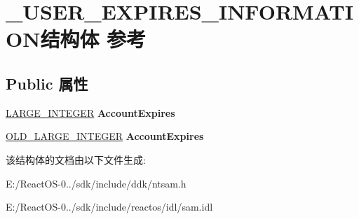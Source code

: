 \hypertarget{struct___u_s_e_r___e_x_p_i_r_e_s___i_n_f_o_r_m_a_t_i_o_n}{}\section{\+\_\+\+U\+S\+E\+R\+\_\+\+E\+X\+P\+I\+R\+E\+S\+\_\+\+I\+N\+F\+O\+R\+M\+A\+T\+I\+O\+N结构体 参考}
\label{struct___u_s_e_r___e_x_p_i_r_e_s___i_n_f_o_r_m_a_t_i_o_n}
\subsection*{Public 属性}
\begin{DoxyCompactItemize}
\item 
\mbox{\label{struct___u_s_e_r___e_x_p_i_r_e_s___i_n_f_o_r_m_a_t_i_o_n_ae59b08253328788e3d51e4ded79305cd}} 
\hyperlink{union___l_a_r_g_e___i_n_t_e_g_e_r}{L\+A\+R\+G\+E\+\_\+\+I\+N\+T\+E\+G\+ER} {\bfseries Account\+Expires}
\item 
\mbox{\label{struct___u_s_e_r___e_x_p_i_r_e_s___i_n_f_o_r_m_a_t_i_o_n_a036e6e365c93d55a422d9c0304556034}} 
\hyperlink{struct___o_l_d___l_a_r_g_e___i_n_t_e_g_e_r}{O\+L\+D\+\_\+\+L\+A\+R\+G\+E\+\_\+\+I\+N\+T\+E\+G\+ER} {\bfseries Account\+Expires}
\end{DoxyCompactItemize}


该结构体的文档由以下文件生成\+:\begin{DoxyCompactItemize}
\item 
E\+:/\+React\+O\+S-\/0../sdk/include/ddk/ntsam.\+h\item 
E\+:/\+React\+O\+S-\/0../sdk/include/reactos/idl/sam.\+idl\end{DoxyCompactItemize}
